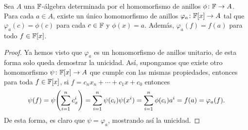 \begin{prop}
  Sea $A$ una $\mathbb{F}$-álgebra determinada por el homomorfismo de anillos $\phi\colon \mathbb{F}\to A$. Para cada $a \in A$, existe un único homomorfismo de anillos $\varphi_a \colon \mathbb{F}[x] \to A$ tal que $\varphi_a(c) = \phi(c)$ para cada $c \in \mathbb{F}$ y $\phi(x) = a$. Además, $\varphi_a(f) = f(a)$ para todo $f \in \mathbb{F}[x]$.
\end{prop}
\begin{proof}
  Ya hemos visto que $\varphi_a$ es un homomorfismo de anillos unitario, de esta forma solo queda demostrar la unicidad. Así, supongamos que existe otro homomorfismo $\psi\colon \mathbb{F}[x] \to A$ que cumple con las mismas propiedades, entonces para toda $f \in \mathbb{F}[x]$, si $f = c_n x_n + \cdots+ c_1x + c_0$ entonces
  \[
    \psi(f) = \psi\paren{\sum_{i=1}^n c_x^i} = \sum_{i=1}^n \psi(c_i) \psi(x^i) = \sum_{i=1}^n \phi(c_i) a^i = f(a) = \varphi_a(f).
  \]
  De esta forma, es claro que $\psi = \varphi_a$, mostrando así la unicidad.
\end{proof}